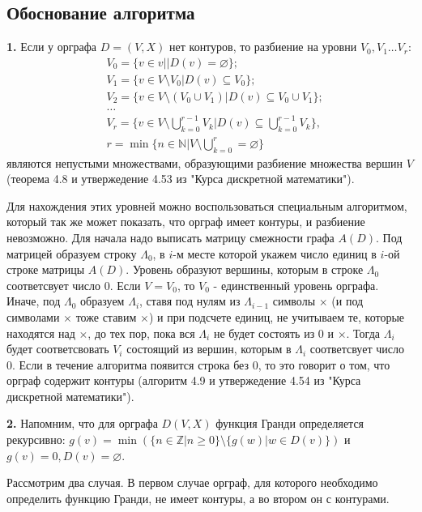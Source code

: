 \documentclass[12pt, letterpaper, titlepage]{article}
\let\emptyset\varnothing
\begin{document}
\subsection{Обоснование алгоритма}

\textbf{1. }Если у орграфа $D = (V, X)$ нет контуров, то разбиение на уровни $V_0, V_1 \dots V_r:$
\[
    \begin{split}
        &V_0=\{v \in v | |D(v) = \emptyset\};\\
        &V_1 = \{v \in V \setminus V_0| D(v) \subseteq V_0\};\\
        &V_2 = \{v \in V \setminus (V_0 \cup V_1) | D(v) \subseteq V_0 \cup V_1\};\\
        &\dots\\
        &V_r = \{v \in V \setminus \bigcup_{k=0}^{r-1}V_k|D(v)\subseteq\bigcup_{k=0}^{r-1}V_k\},\\
        &r = \min\{n \in \mathbb{N} |V \setminus \bigcup_{k=0}^{r} = \emptyset\}
    \end{split}
\]
являются непустыми множествами, образующими разбиение множества вершин $V$ (теорема 4.8  и утвержедение 4.53 из "Курса дискретной математики").

Для нахождения этих уровней можно воспользоваться специальным алгоритмом, который так же может показать, что орграф имеет контуры, и разбиение невозможно.
Для начала надо выписать матрицу смежности графа $A(D)$. Под матрицей образуем строку $\Lambda_0$, в $i$-м месте которой укажем число единиц в $i$-ой строке матрицы $A(D)$.
Уровень образуют вершины, которым в строке $\Lambda_0$ соответсвует число 0. Если $V = V_0$, то $V_0$ - единственный уровень орграфа. Иначе, под $\Lambda_0$ образуем $\Lambda_i$,
ставя под нулям из $\Lambda_{i-1}$ символы $\times$ (и под символами $\times$ тоже ставим $\times$) и при подсчете единиц, не учитываем те, которые находятся над $\times$, до тех пор, пока
вся $\Lambda_i$ не будет состоять из 0 и $\times$. Тогда $\Lambda_i$ будет соответсвовать $V_i$ состоящий из вершин, которым в $\Lambda_i$ соответсвует число 0. Если в течение алгоритма появится строка без 0,
то это говорит о том, что орграф содержит контуры (алгоритм 4.9  и утвержедение 4.54 из "Курса дискретной математики").
 
\textbf{2. }Напомним, что для орграфа $D(V,X)$ функция Гранди определяется рекурсивно: $g(v) = \min(\{ n \in \mathbb{Z} | n \geq 0\} \setminus \{g(w) | w \in D(v)\})$ и $ g(v)=0, D(v) = \emptyset$.

Рассмотрим два случая. В первом случае орграф, для которого необходимо определить функцию Гранди, не имеет контуры, а во втором он с контурами.
\end{document}
